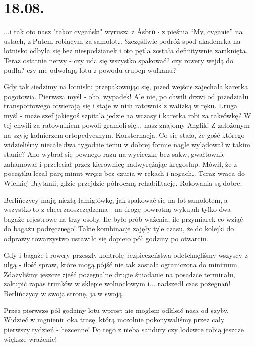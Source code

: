\chapter{18.08.}

...i tak oto nasz "tabor cygański" wyrusza z Ásbrú - z pieśnią “My, cyganie” na ustach, z Putem robiącym za samolot… Szczęśliwie podróż spod akademika na lotnisko odbyła się bez niespodzianek i oto pętla została definitywnie zamknięta. Teraz ostatnie nerwy - czy uda się wszystko spakować? czy rowery wejdą do pudła? czy nie odwołają lotu z powodu erupcji wulkanu?

Gdy tak siedzimy na lotnisku przepakowując się, przed wejście zajechała karetka pogotowia. Pierwsza myśl - oho, wypadek! Ale nie, po chwili drzwi od przedziału transportowego otwierają się i staje w nich ratownik z walizką w ręku. Druga myśl - może szef jakiegoś szpitala jedzie na wczasy i karetka robi za taksówkę? W tej chwili za ratownikiem powoli gramoli się... nasz znajomy Anglik! Z założonym na szyję kołnierzem ortopedycznym. Konsternacja. Co się stało, że gość którego widzieliśmy niecałe dwa tygodnie temu w dobrej formie nagle wylądował w takim stanie? Ano wybrał się pewnego razu na wycieczkę bez sakw, gwałtownie zahamował i przeleciał przez kierownicę nadwyrężając kręgosłup. Mówił, że z początku leżał parę minut wręcz bez czucia w rękach i nogach… Teraz wraca do Wielkiej Brytanii, gdzie przejdzie półroczną rehabilitację. Rokowania są dobre.

Berlińczycy mają niezłą łamigłówkę, jak spakować się na lot samolotem, a wszystko to z chęci zaoszczędzenia - na drogę powrotną wykupili tylko dwa bagaże rejestrowe na trzy osoby. Ile było prób ważenia, ile przymiarek co wziąć do bagażu podręcznego! Takie kombinacje zajęły tyle czasu, że do kolejki do odprawy towarzystwo ustawiło się dopiero pół godziny po otwarciu.


Gdy i bagaże i rowery przeszły kontrolę bezpieczeństwa odetchnęliśmy wszyscy z ulgą - ilość spraw, które mogą pójść nie tak została ograniczona do minimum. Zdążyliśmy jeszcze zjeść pożegnalne drugie śniadanie na posadzce terminalu, zakupić zapas trunków w sklepie wolnocłowym i... nadszedł czas pożegnań! Berlińczycy w swoją stronę, ja w swoją.

Przez pierwsze pół godziny lotu wprost nie mogłem odkleić nosa od szyby. Widzieć w mgnieniu oka trasę, którą mozolnie pokonywaliśmy przez cały pierwszy tydzień - bezcenne! Do tego z nieba sandury czy lodowce robią jeszcze większe wrażenie!

